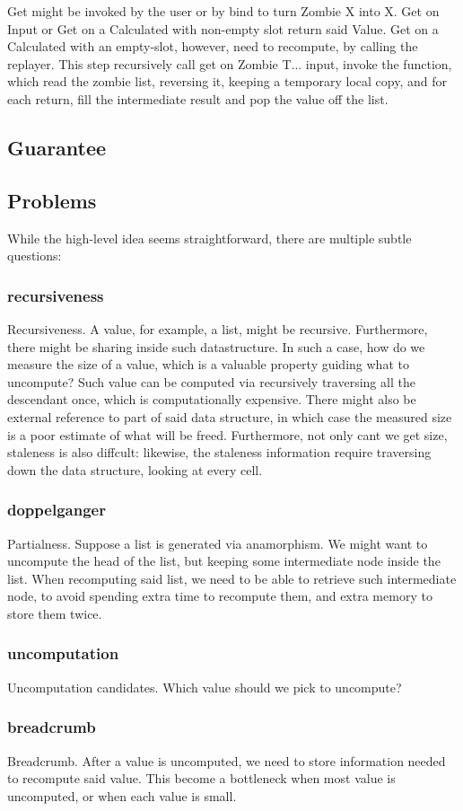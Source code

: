 Get might be invoked by the user or by bind to turn Zombie X into X. Get on Input or Get on a Calculated with non-empty slot return said Value. Get on a Calculated with an empty-slot, however, need to recompute, by calling the replayer. This step recursively call get on Zombie T... input, invoke the function, which read the zombie list, reversing it, keeping a temporary local copy, and for each return, fill the intermediate result and pop the value off the list.
\subsection{Guarantee}
\subsection{Problems}
While the high-level idea seems straightforward, there are multiple subtle questions: 
\subsubsection{recursiveness}
 Recursiveness. A value, for example, a list, might be recursive. Furthermore, there might be sharing inside such datastructure. In such a case, how do we measure the size of a value, which is a valuable property guiding what to uncompute? Such value can be computed via recursively traversing all the descendant once, which is computationally expensive. There might also be external reference to part of said data structure, in which case the measured size is a poor estimate of what will be freed. Furthermore, not only cant we get size, staleness is also diffcult: likewise, the staleness information require traversing down the data structure, looking at every cell.
\subsubsection{doppelganger}
Partialness. Suppose a list is generated via anamorphism. We might want to uncompute the head of the list, but keeping some intermediate node inside the list.
When recomputing said list, we need to be able to retrieve such intermediate node, to
avoid spending extra time to recompute them, and extra memory to store them twice.
\subsubsection{uncomputation}
Uncomputation candidates. Which value should we pick to uncompute?
\subsubsection{breadcrumb}
Breadcrumb. After a value is uncomputed, we need to store information needed to recompute said value. This become a bottleneck when most value is uncomputed, or when each value is small.
